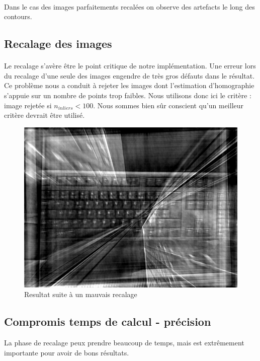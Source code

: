 \documentclass[a4paper,10pt]{report}
\begin{document}
\paragraph{}
Dans le cas des images parfaitements recalées on observe des artefacts le long des contours.

\subsection{Recalage des images}

\paragraph{}
Le recalage s'avère être le point critique de notre implémentation. Une erreur lors du recalage d'une seule des images 
engendre de très gros défauts dans le résultat. Ce problème nous a conduit à rejeter les images dont l'estimation d'homographie
s'appuie sur un nombre de points trop faibles. Nous utilisons donc ici le critère : image rejetée si \(n_{inliers} < 100\). 
Nous sommes bien sûr conscient qu'un meilleur critère devrait être utilisé. 

\begin{figure}[h]
\centering
\includegraphics[width=0.5\linewidth]{ressource/keyboardresultat.jpg} 
\caption{Resultat suite à un mauvais recalage}
\label{fig:mauvaisrecalage}
\end{figure}


\subsection{Compromis temps de calcul - précision}
La phase de recalage peux prendre beaucoup de temps, mais est extrêmement importante pour avoir de bons résultats.
\end{document}
